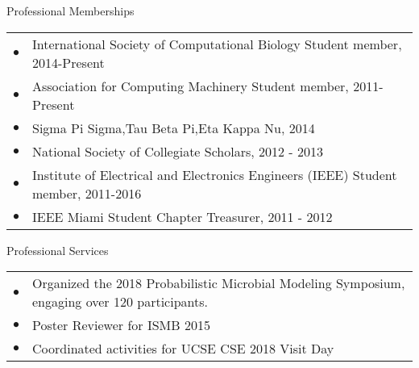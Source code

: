 \documentclass{resume} %
\begin{document}
\begin{rSection}{Professional Memberships}
  \begin{tabular}{ll}
    $\bullet$ & International Society of Computational Biology Student member, 2014-Present\\
    $\bullet$ & Association for Computing Machinery Student member, 2011-Present \\
    $\bullet$ & Sigma Pi Sigma,Tau Beta Pi,Eta Kappa Nu, 2014 \\
    $\bullet$ & National Society of Collegiate Scholars, 2012 - 2013\\
    $\bullet$ & Institute of Electrical and Electronics Engineers (IEEE) Student member, 2011-2016 \\
    $\bullet$ & IEEE Miami Student Chapter Treasurer, 2011 - 2012\\
  \end{tabular}
\end{rSection}

\begin{rSection}{Professional Services}
  \begin{tabular}{ll}
    $\bullet$ & Organized the 2018 Probabilistic Microbial Modeling Symposium, engaging over 120 participants.\\
    $\bullet$ & Poster Reviewer for ISMB 2015\\
    $\bullet$ & Coordinated activities for UCSE CSE 2018 Visit Day\\
  \end{tabular}
\end{rSection}
\end{document}
